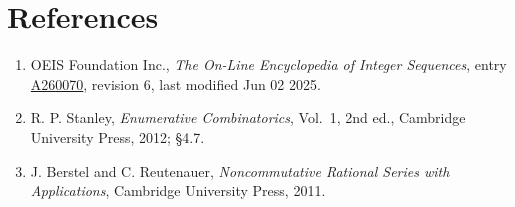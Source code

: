 \documentclass[11pt]{article}
\theoremstyle{definition}
\begin{document}
\section{References}

\begin{enumerate}

\item OEIS Foundation Inc., \emph{The On-Line Encyclopedia of Integer Sequences}, entry \href{https://oeis.org/A260070}{A260070}, revision 6, last modified Jun 02 2025.

\item R. P. Stanley, \emph{Enumerative Combinatorics}, Vol.~1, 2nd ed., Cambridge University Press, 2012; \S4.7.

\item J. Berstel and C. Reutenauer, \emph{Noncommutative Rational Series with Applications}, Cambridge University Press, 2011.

\end{enumerate}
\end{document}
